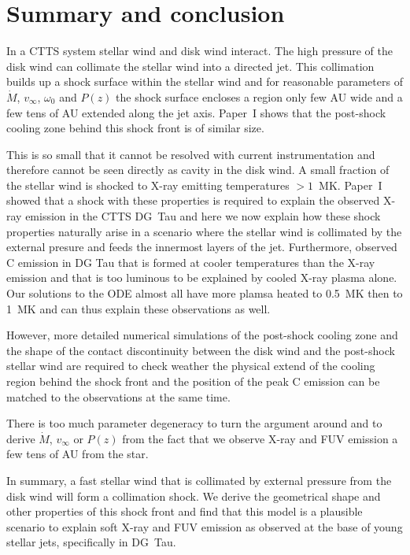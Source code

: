 \section{Summary and conclusion}
\label{sect:conclusion}
In a CTTS system stellar wind and disk wind interact. The high pressure of the disk wind can collimate the stellar wind into a directed jet. This collimation builds up a shock surface within the stellar wind and for reasonable parameters of $\dot M$, $v_\infty$, $\omega_0$ and $P(z)$ the shock surface encloses a region only few AU wide and a few tens of AU extended along the jet axis. 
Paper~I shows that the post-shock cooling zone behind this shock front is of similar size.
 
This is so small that it cannot be resolved with current instrumentation and therefore cannot be seen directly as cavity in the disk wind. A small fraction of the stellar wind is shocked to X-ray emitting temperatures $>1$~MK. 
Paper~I showed that a shock with these properties is required to explain the observed X-ray emission in the CTTS DG~Tau and here we now explain how these shock properties naturally arise in a scenario where the stellar wind is collimated by the external presure and feeds the innermost layers of the jet.
Furthermore, \citet{2013A&A...550L...1S} observed C emission in DG Tau that is formed at cooler temperatures than the X-ray emission and that is too luminous to be explained by cooled X-ray plasma alone. Our solutions to the ODE almost all have more plamsa heated to 0.5~MK then to 1~MK and can thus explain these observations as well.

However, more detailed numerical simulations of the post-shock cooling zone and the shape of the contact discontinuity between the disk wind and the post-shock stellar wind are required to check weather the physical extend of the cooling region behind the shock front and the position of the peak  C emission can be matched to the observations at the same time.

There is too much parameter degeneracy to turn the argument around and to derive $\dot M$, $v_\infty$ or $P(z)$ from the fact that we observe X-ray and FUV emission a few tens of AU from the star.

In summary, a fast stellar wind that is collimated by external pressure from the disk wind will form a collimation shock. We derive the geometrical shape and other properties of this shock front and find that this model is a plausible scenario to explain soft X-ray and FUV emission as observed at the base of young stellar jets, specifically in DG~Tau.


